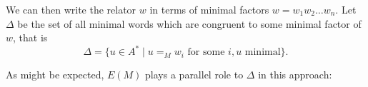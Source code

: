 \documentclass[noindex,noinsetproof,emphthm,12pt]{lmaths}
\begin{document}
We can then write the relator $w$ in terms of minimal factors $w = w_1w_2\ldots w_n$. Let $\Delta$ be the set of all minimal words which are congruent to some minimal factor of $w$, that is
	\[ \Delta = \{ u \in A^* \mid u =_M w_i \text{ for some } i, u\text{ minimal} \}. \]

\begin{comment}
\begin{lemma}
	In a one-relation special monoid, $\Delta = \{w_1, \ldots, w_n\}$. \incomplete
\end{lemma}
\begin{proof}
	If $w$ is the only minimal factor of $w$, then since any minimal word must be no longer than $w$, $w$ is the only word in $\Delta$.

	Otherwise, let $1 \le i \le n$ and consider the set $\Delta_i = \{ u \in A^* \mid u =_M w_i \}$. Since all the words in this set are congruent in $M$, and the congruence of $R$ is equal to the congruence of $M$, it follows from the fact that $R$ is confluent and noetherian that there is a unique element $\bar u \in \Delta_i$ which is irreducible by $R$.
\end{proof}
\end{comment}

As might be expected, $E(M)$ plays a parallel role to $\Delta$ in this approach:
\end{document}
